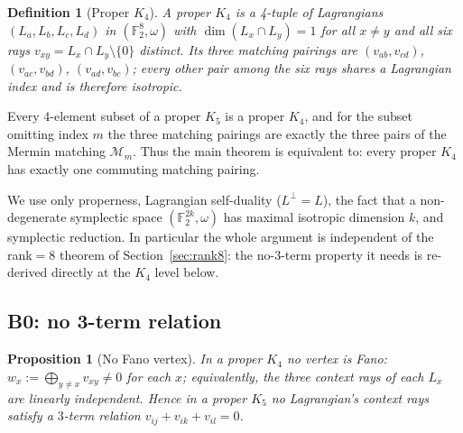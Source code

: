 \documentclass[11pt,a4paper]{article}
\newtheorem{proposition}[theorem]{Proposition}
\newtheorem{definition}[theorem]{Definition}
\theoremstyle{remark}
\begin{document}
\begin{definition}[Proper $K_4$]\label{def:k4}
A \emph{proper $K_4$} is a 4-tuple of Lagrangians $(L_a,L_b,L_c,L_d)$ in
$(\mathbb{F}_2^8,\omega)$ with $\dim(L_x\cap L_y)=1$ for all $x\neq y$ and all six
rays $v_{xy}=L_x\cap L_y\setminus\{0\}$ distinct.
Its three \emph{matching pairings} are
$(v_{ab},v_{cd})$, $(v_{ac},v_{bd})$, $(v_{ad},v_{bc})$; every other pair among the
six rays shares a Lagrangian index and is therefore isotropic.
\end{definition}

Every 4-element subset of a proper $K_5$ is a proper $K_4$, and for the subset
omitting index $m$ the three matching pairings are exactly the three pairs of the
Mermin matching $\mathcal{M}_m$. Thus the main theorem is equivalent to: every
proper $K_4$ has exactly one commuting matching pairing.

We use only properness, Lagrangian self-duality ($L^\perp=L$), the fact that a
non-degenerate symplectic space $(\mathbb{F}_2^{2k},\omega)$ has maximal isotropic
dimension $k$, and symplectic reduction. In particular the whole argument is
independent of the rank$=8$ theorem of Section~\ref{sec:rank8}: the no-3-term
property it needs is re-derived directly at the $K_4$ level below.

\subsection{B0: no 3-term relation}

\begin{proposition}[No Fano vertex]\label{prop:no3term}
In a proper $K_4$ no vertex is Fano: $w_x := \bigoplus_{y\neq x} v_{xy}\neq 0$ for
each $x$; equivalently, the three context rays of each $L_x$ are linearly
independent. Hence in a proper $K_5$ no Lagrangian's context rays satisfy a
$3$-term relation $v_{ij}+v_{ik}+v_{il}=0$.
\end{proposition}
\end{document}
